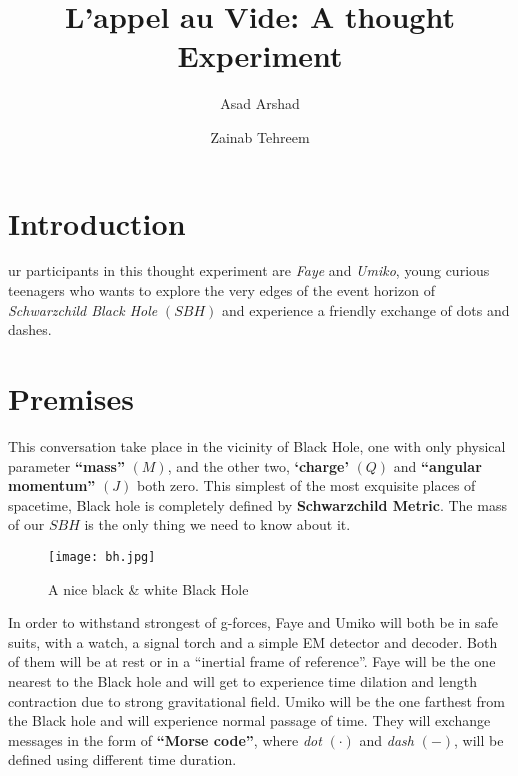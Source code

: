 \documentclass[9pt,a4paper,twocolumn,twoside]{tau-class/tau}
\title{L'appel au Vide: A thought Experiment}
\author[a,1]{Asad Arshad}
\author[b,2]{Zainab Tehreem}
\affil[a]{BS-SS Departement of Space Science}
\affil[b]{BS-SS Departement of Space Science}
\begin{document}
		
    \maketitle 
    \thispagestyle{firststyle} 
    \tauabstract 
    

\section{Introduction}

    ur participants in this thought experiment are \emph{Faye} and \emph{Umiko}, young curious teenagers who wants to explore the very edges of the event horizon of \emph{Schwarzchild Black Hole} \((SBH)\) and experience a friendly exchange of dots and dashes.



\section{Premises}

    This conversation take place in the vicinity of Black Hole, one with only physical parameter \textbf{``mass''} \((M)\), and the other two, \textbf{`charge'} \((Q)\) and \textbf{``angular momentum''} \((J)\) both zero. This simplest of the most exquisite places of spacetime, Black hole is completely defined by \textbf{Schwarzchild Metric}. The mass of our \(SBH\) is the only thing we need to know about it.

    \begin{figure}[H]
        \centering
        \texttt{[image: bh.jpg]}
        \caption{A nice black \& white Black Hole}
        \label{fig:figure}
    \end{figure}
    

    In order to withstand strongest of g-forces, Faye and Umiko will both be in safe suits, with a watch, a signal torch and a simple EM detector and decoder.  Both of them will be at rest or in a ``inertial frame of reference''. Faye will be the one nearest to the Black hole and will get to experience time dilation and length contraction due to strong gravitational field. Umiko will be the one farthest from the Black hole and will experience normal passage of time. They will exchange messages in the form of \textbf{``Morse code''}, where \emph{dot} \((\cdot)\) and \emph{dash} \((-)\), will be defined using different time duration.
	
\end{document}
